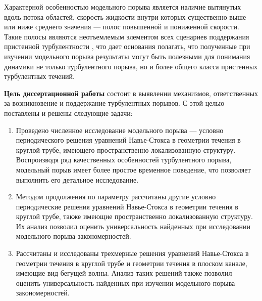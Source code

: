 Характерной особенностью модельного порыва является наличие вытянутых вдоль потока областей, скорость жидкости внутри которых существенно выше или ниже среднего значения --- полос повышенной и пониженной скорости. Такие полосы являются неотъемлемым элементом всех сценариев поддержания пристенной турбулентности \cite{Hamilton1995, Waleffe1997, Schoppa2002}, что дает основания полагать, что полученные при изучении модельного порыва результаты могут быть полезными для понимания динамики не только турбулентного порыва, но и более общего класса пристенных турбулентных течений. 



{\bf Цель диссертационной работы} состоит в выявлении механизмов, ответственных за возникновение и поддержание турбулентных порывов. 
С этой целью поставлены и решены следующие задачи: 
\begin{enumerate}
\item Проведено численное исследование модельного порыва --- условно периодического решения уравнений Навье-Стокса в геометрии течения в круглой трубе, имеющего пространственно-локализованную структуру. Воспроизводя ряд качественных особенностей турбулентного порыва, модельный порыв имеет более простое временное поведение, что позволяет выполнить его детальное исследование. 
\item Методом продолжения по параметру рассчитаны другие условно периодические решения уравнений Навье-Стокса в геометрии течения в круглой трубе, также имеющие пространственно локализованную структуру. Их анализ позволил оценить универсальность найденных при исследовании модельного порыва закономерностей. 
\item Рассчитаны и исследованы трехмерные решения уравнений Навье-Стокса в геометрии течения в круглой трубе и геометрии течения в плоском канале, имеющие вид бегущей волны. Анализ таких решений также позволил оценить универсальность найденных при изучении модельного порыва закономерностей. 
\end{enumerate}

